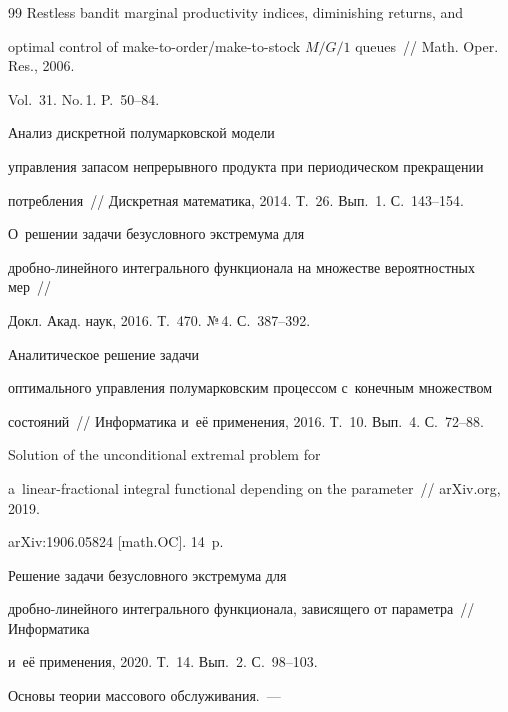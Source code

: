 {{\begin{thebibliography}{99}
   Restless bandit marginal productivity indices, diminishing returns, and 

optimal control of make-to-order/make-to-stock $M/G/1$ queues~/\!\!/ Math. Oper. Res., 2006. 

Vol.~31. No.\,1. P.~50--84.


   Анализ дискретной полумарковской модели 

управ\-ления запасом непрерывного продукта при периодическом прекращении 

по\-треб\-ле\-ния~/\!\!/ Дискретная математика, 2014. Т.~26. Вып.~1. С.~143--154.


   О~решении задачи безусловного экстремума для  

дроб\-но-ли\-ней\-но\-го интегрального функционала на множестве вероятностных мер~/\!\!/ 

Докл. Акад. наук, 2016. Т.~470. №\,4. С.~387--392.


   Аналитическое решение задачи 

оптимального управления полумарковским процессом с~конечным множеством 

состояний~/\!\!/ Информатика и~её применения, 2016. Т.~10. Вып.~4. С.~72--88.


   Solution of the unconditional extremal problem for  

a~linear-fractional integral functional depending on the parameter~/\!\!/ \mbox{arXiv.org}, 2019.\linebreak 

\mbox{arXiv}:1906.05824 [math.OC]. 14~p.


   Решение задачи безусловного экстремума для 

дроб\-но-линейного интегрального функционала, зависящего от параметра~/\!\!/ Ин\-фор\-ма\-тика 

и~её применения, 2020. Т.~14. Вып.~2. С.~98--103.


   Основы теории массового обслуживания.~---  


\end{thebibliography}}}
